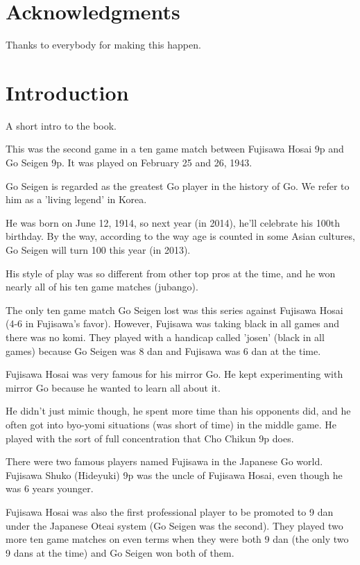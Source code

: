 \documentclass[letterpaper,12pt]{memoir}
\begin{document}
\chapter{Acknowledgments}
Thanks to everybody for making this happen.



\chapter{Introduction}
A short intro to the book.



\mainmatter

This was the second game in a ten game match between Fujisawa Hosai 9p and Go Seigen 9p. It was played on February 25 and 26, 1943.

Go Seigen is regarded as the greatest Go player in the history of Go. We refer to him as a 'living legend' in Korea. 

He was born on June 12, 1914, so next year (in 2014), he'll celebrate his 100th birthday. By the way, according to the way age is counted in some Asian cultures, Go Seigen will turn 100 this year (in 2013).

His style of play was so different from other top pros at the time, and he won nearly all of his ten game matches (jubango).

The only ten game match Go Seigen lost was this series against Fujisawa Hosai (4-6 in Fujisawa's favor). However, Fujisawa was taking black in all games and there was no komi. They played with a handicap called 'josen' (black in all games) because Go Seigen was 8 dan and Fujisawa was 6 dan at the time.

Fujisawa Hosai was very famous for his mirror Go. He kept experimenting with mirror Go because he wanted to learn all about it.

He didn't just mimic though, he spent more time than his opponents did, and he often got into byo-yomi situations (was short of time) in the middle game. He played with the sort of full concentration that Cho Chikun 9p does.

There were two famous players named Fujisawa in the Japanese Go world. Fujisawa Shuko (Hideyuki) 9p was the uncle of Fujisawa Hosai, even though he was 6 years younger.

Fujisawa Hosai was also the first professional player to be promoted to 9 dan under the Japanese Oteai system (Go Seigen was the second). They played two more ten game matches on even terms when they were both 9 dan (the only two 9 dans at the time) and Go Seigen won both of them.
\end{document}
